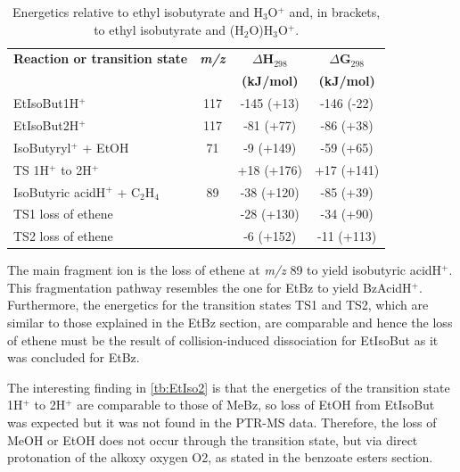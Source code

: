 \begin{table}[htbp]
\centering
\caption{Energetics relative to ethyl isobutyrate and H$_3$O$^+$ and, in brackets, to ethyl isobutyrate and (H$_2$O)H$_3$O$^+$.}
\label{tb:EtIso2}
\begin{tabular}{lccc}
\toprule
\textbf{Reaction or transition state}	&\textbf{\textit{m/z} } &\textbf{$\Delta$H$_{298}$} &\textbf{$\Delta$G$_{298}$}\\
& &	\textbf{(kJ/mol)} &\textbf{(kJ/mol)} \\  \toprule
EtIsoBut1H$^+$ & 117 & -145 (+13) & -146 (-22) \\ \midrule
EtIsoBut2H$^+$ & 117 & -81 (+77) & -86 (+38) \\ \midrule
IsoButyryl$^+$ + EtOH & 71 & -9 (+149) & -59 (+65) \\ \midrule
TS 1H$^+$ to 2H$^+$ &  & +18 (+176) & +17 (+141) \\ \midrule
IsoButyric acidH$^+$ + C$_2$H$_4$ & 89 & -38 (+120) & -85 (+39) \\ \midrule
TS1 loss of ethene  &  & -28 (+130) & -34 (+90) \\ \midrule
TS2 loss of ethene  &  & -6 (+152) & -11 (+113) \\
\bottomrule
\end{tabular}
\end{table}




The main fragment ion is the loss of ethene at \textit{m/z} 89 to yield isobutyric acidH$^+$.
%
This fragmentation pathway resembles the one for EtBz to yield BzAcidH$^+$.
%
Furthermore, the energetics for the transition states TS1 and TS2, which are similar to those explained in the EtBz section, are comparable and hence the loss of ethene must be the result of collision-induced dissociation for EtIsoBut as it was concluded for EtBz.
%


The interesting finding in \autoref{tb:EtIso2} is that the energetics of the transition state 1H$^+$ to 2H$^+$ are comparable to those of MeBz, so loss of EtOH from EtIsoBut was expected but it was not found in the PTR-MS data.
%
Therefore, the loss of MeOH or EtOH does not occur through the transition state, but via direct protonation of the alkoxy oxygen O2, as stated in the benzoate esters section.











